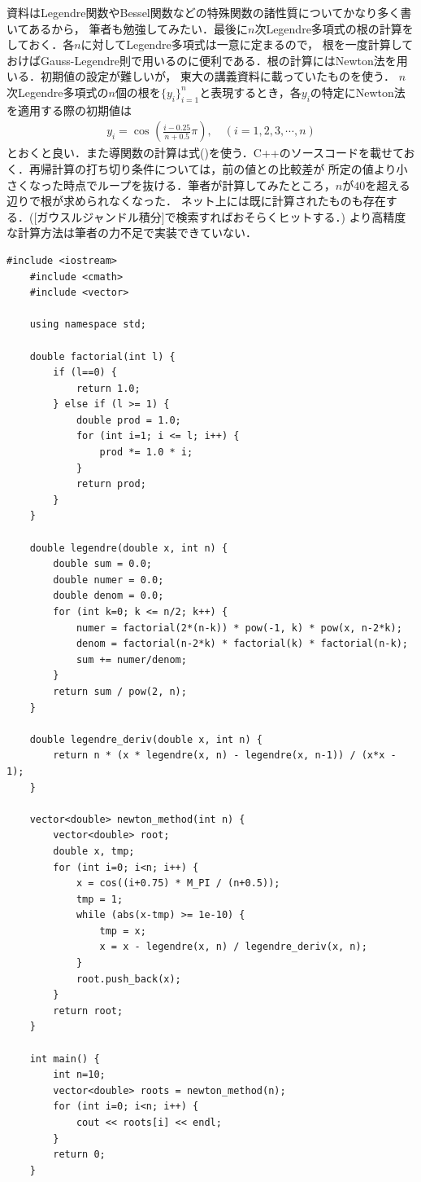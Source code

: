 \documentclass[a4j,papersize,disablejfam,slide,14pt]{jsarticle}
\def\cos#1#2{\operatorname{cos}^{#2} #1} %
\begin{document}
    資料\cite{terakan}は{\rm Legendre}関数や{\rm Bessel}関数などの特殊関数の諸性質についてかなり多く書いてあるから，
    筆者も勉強してみたい．最後に$n$次{\rm Legendre}多項式の根の計算をしておく．各$n$に対して{\rm Legendre}多項式は一意に定まるので，
    根を一度計算しておけば{\rm Gauss-Legendre}則で用いるのに便利である．根の計算には{\rm Newton}法を用いる．初期値の設定が難しいが，
    東大の講義資料に載っていたものを使う．
    $n$次{\rm Legendre}多項式の$n$個の根を$\{y_i\}_{i=1}^{n}$と表現するとき，各$y_i$の特定に{\rm Newton}法を適用する際の初期値は
    \begin{align}
    	y_i = \cos{ \left( \frac{i-0.25}{n+0.5} \pi \right) }{}, \quad (i = 1,2,3,\cdots,n)
    \end{align}
    とおくと良い．また導関数の計算は式()を使う．{\rm C++}のソースコードを載せておく．再帰計算の打ち切り条件については，前の値との比較差が
    所定の値より小さくなった時点でループを抜ける．筆者が計算してみたところ，$n$が$40$を超える辺りで根が求められなくなった．
    ネット上には既に計算されたものも存在する．([ガウスルジャンドル積分]で検索すればおそらくヒットする．)
    より高精度な計算方法は筆者の力不足で実装できていない．
    \begin{lstlisting}[style=customCpp]
	#include <iostream>
	#include <cmath>
	#include <vector>
	
	using namespace std;
	
	double factorial(int l) {
		if (l==0) {
			return 1.0;
		} else if (l >= 1) {
			double prod = 1.0;
			for (int i=1; i <= l; i++) {
				prod *= 1.0 * i;
			}
			return prod;
		}
	}
	
	double legendre(double x, int n) {
		double sum = 0.0;
		double numer = 0.0;
		double denom = 0.0;
		for (int k=0; k <= n/2; k++) {
			numer = factorial(2*(n-k)) * pow(-1, k) * pow(x, n-2*k);
			denom = factorial(n-2*k) * factorial(k) * factorial(n-k);
			sum += numer/denom;
		}
		return sum / pow(2, n);
	}
	
	double legendre_deriv(double x, int n) {
		return n * (x * legendre(x, n) - legendre(x, n-1)) / (x*x - 1);
	}
	
	vector<double> newton_method(int n) {
		vector<double> root;
		double x, tmp;
		for (int i=0; i<n; i++) {
			x = cos((i+0.75) * M_PI / (n+0.5));
			tmp = 1;
			while (abs(x-tmp) >= 1e-10) {
				tmp = x;
				x = x - legendre(x, n) / legendre_deriv(x, n);
			}
			root.push_back(x);
		}
		return root;
	}
	
	int main() {
		int n=10;
		vector<double> roots = newton_method(n);
		for (int i=0; i<n; i++) {
			cout << roots[i] << endl;
		}
		return 0;
	}
    \end{lstlisting}
\end{document}
